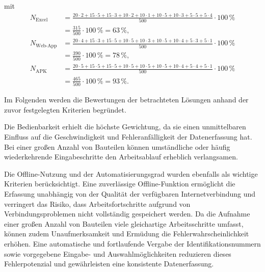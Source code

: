 mit
\begin{align}
    N_{\text{Excel}}
    &=
    \frac{
        20 \cdot 2 +
        15 \cdot 5 +
        15 \cdot 3 +
        10 \cdot 2 +
        10 \cdot 1 +
        10 \cdot 5 +
        10 \cdot 3 +
        5 \cdot 5 +
        5 \cdot 4
    }{500}
    \cdot 100\,\% \\
    &=
    \frac{315}{500}
    \cdot 100\,\%
    =
    63\,\%,
    \\[1em]
    N_{\text{Web-App}}
    &=
    \frac{
        20 \cdot 4 +
        15 \cdot 3 +
        15 \cdot 5 +
        10 \cdot 5 +
        10 \cdot 3 +
        10 \cdot 5 +
        10 \cdot 4 +
        5 \cdot 3 +
        5 \cdot 1
    }{500}
    \cdot 100\,\% \\
    &=
    \frac{390}{500}
    \cdot 100\,\%
    =
    78\,\%,
    \\[1em]
    N_{\text{APK}}
    &=
    \frac{
        20 \cdot 5 +
        15 \cdot 5 +
        15 \cdot 5 +
        10 \cdot 5 +
        10 \cdot 5 +
        10 \cdot 5 +
        10 \cdot 4 +
        5 \cdot 4 +
        5 \cdot 1
    }{500}
    \cdot 100\,\% \\
    &=
    \frac{465}{500}
    \cdot 100\,\%
    =
    93\,\%.
\end{align}


Im Folgenden werden die Bewertungen der betrachteten Lösungen anhand der zuvor festgelegten Kriterien begründet.


Die Bedienbarkeit erhielt die höchste Gewichtung, da sie einen unmittelbaren Einfluss auf die Geschwindigkeit und Fehleranfälligkeit der Datenerfassung hat.
Bei einer großen Anzahl von Bauteilen können umständliche oder häufig wiederkehrende Eingabeschritte den Arbeitsablauf erheblich verlangsamen.

Die Offline-Nutzung und der Automatisierungsgrad wurden ebenfalls als wichtige Kriterien berücksichtigt.
Eine zuverlässige Offline-Funktion ermöglicht die Erfassung unabhängig von der Qualität der verfügbaren Internetverbindung und verringert das Risiko, dass Arbeitsfortschritte aufgrund von Verbindungsproblemen nicht vollständig gespeichert werden.
Da die Aufnahme einer großen Anzahl von Bauteilen viele gleichartige Arbeitsschritte umfasst, können zudem Unaufmerksamkeit und Ermüdung die Fehlerwahrscheinlichkeit erhöhen.
Eine automatische und fortlaufende Vergabe der Identifikationsnummern sowie vorgegebene Eingabe- und Auswahlmöglichkeiten reduzieren dieses Fehlerpotenzial und gewährleisten eine konsistente Datenerfassung.

